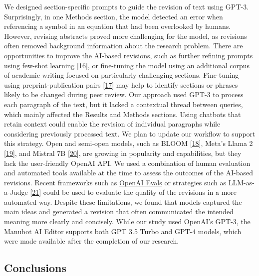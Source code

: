 \documentclass[
]{article}
\begin{document}
We designed section-specific prompts to guide the revision of text using GPT-3.
Surprisingly, in one Methods section, the model detected an error when referencing a symbol in an equation that had been overlooked by humans.
However, revising abstracts proved more challenging for the model, as revisions often removed background information about the research problem.
There are opportunities to improve the AI-based revisions, such as further refining prompts using few-shot learning {[}\protect\hyperlink{ref-S1Lim9f9}{16}{]}, or fine-tuning the model using an additional corpus of academic writing focused on particularly challenging sections.
Fine-tuning using preprint-publication pairs {[}\protect\hyperlink{ref-WVt383GU}{17}{]} may help to identify sections or phrases likely to be changed during peer review.
Our approach used GPT-3 to process each paragraph of the text, but it lacked a contextual thread between queries, which mainly affected the Results and Methods sections.
Using chatbots that retain context could enable the revision of individual paragraphs while considering previously processed text.
We plan to update our workflow to support this strategy.
Open and semi-open models, such as BLOOM {[}\protect\hyperlink{ref-I4d1F0yv}{18}{]}, Meta's Llama 2 {[}\protect\hyperlink{ref-A213xAuD}{19}{]}, and Mistral 7B {[}\protect\hyperlink{ref-1wOalSCp}{20}{]}, are growing in popularity and capabilities, but they lack the user-friendly OpenAI API.
We used a combination of human evaluation and automated tools available at the time to assess the outcomes of the AI-based revisions.
Recent frameworks such as \href{https://github.com/openai/evals}{OpenAI Evals} or strategies such as LLM-as-a-Judge {[}\protect\hyperlink{ref-LhEwBH2w}{21}{]} could be used to evaluate the quality of the revisions in a more automated way.
Despite these limitations, we found that models captured the main ideas and generated a revision that often communicated the intended meaning more clearly and concisely.
While our study used OpenAI's GPT-3, the Manubot AI Editor supports both GPT 3.5 Turbo and GPT-4 models, which were made available after the completion of our research.

\hypertarget{conclusions}{%
\subsection{Conclusions}\label{conclusions}}
\end{document}
